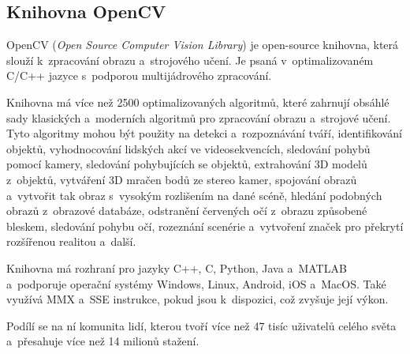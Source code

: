 \subsection{Knihovna OpenCV}
OpenCV (\textit{Open Source Computer Vision Library}) je open-source knihovna, která slouží k~zpracování obrazu a~strojového učení. Je psaná v~optimalizovaném C/C++ jazyce s~podporou multijádrového zpracování.

Knihovna má více než 2500 optimalizovaných algoritmů, které zahrnují obsáhlé sady klasických a~moderních algoritmů pro zpracování obrazu a~strojové učení. Tyto algoritmy mohou být použity na detekci a~rozpoznávání tváří, identifikování objektů, vyhodnocování lidských akcí ve videosekvencích, sledování pohybů pomocí kamery, sledování pohybujících se objektů, extrahování 3D modelů z~objektů, vytváření 3D mračen bodů ze stereo kamer, spojování obrazů a~vytvořit tak obraz s~vysokým rozlišením na dané scéně, hledání podobných obrazů z~obrazové databáze, odstranění červených očí z~obrazu způsobené bleskem, sledování pohybu očí, rozeznání scenérie a~vytvoření značek pro překrytí rozšířenou realitou a~další.

Knihovna má rozhraní pro jazyky C++, C, Python, Java a~MATLAB a~podporuje operační systémy Windows, Linux, Android, iOS a~MacOS. 
Také využívá MMX a~SSE instrukce, pokud jsou k~dispozici, což zvyšuje její výkon.

Podílí se na ní komunita lidí, kterou tvoří více než 47 tisíc uživatelů celého světa a~přesahuje více než 14 milionů stažení. 


